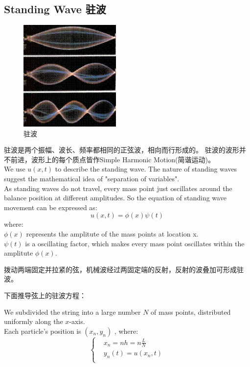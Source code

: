 \documentclass[UTF8,10pt,a4paper]{ctexart}
\begin{document}
	\subsection{Standing Wave 驻波}
		\begin{figure}[ht]
			\centering
			\includegraphics[width=5cm]{standingwave.png}
			\caption{驻波}
			\label{fig:standingWave}
		\end{figure}
		\noindent
		驻波是两个振幅、波长、频率都相同的正弦波，相向而行形成的。
		驻波的波形并不前进，波形上的每个质点皆作Simple Harmonic Motion(简谐运动)。\\
		We use $u(x,t)$ to describe the standing wave. The nature of standing waves suggest 
		the mathematical idea of "separation of variables".\\
		\noindent
		As standing waves do not travel, every mass point just oscillates around the balance position 
		at different amplitudes. So the equation of standing wave movement can be expressed as:
		\begin{equation}
		u(x,t)=\phi (x) \psi(t)
		\end{equation}
		where:\\
		 	$\phi(x)$ represents the amplitute of the mass points at location x. \\
		 	$\psi(t)$ is a oscillating factor, which makes every mass point 
			oscillates within the amplitute $\phi(x)$.
			  
		拨动两端固定并拉紧的弦，机械波经过两固定端的反射，反射的波叠加可形成驻波。
		  
		下面推导弦上的驻波方程：

  		\noindent
  		We subdivided the string into a large number $N$ of mass points, distributed 
  		uniformly along the $x$-axis.\\
  		Each particle's position is $(x_n,y_n)$	, where:
		\begin{equation}
		    \left\{
			\begin{aligned}
				&x_n =nh=n\frac{L}{N} \\
				&y_n(t) =u(x_n,t) \\
			\end{aligned}
			\right.
		\end{equation}
		
\end{document}
